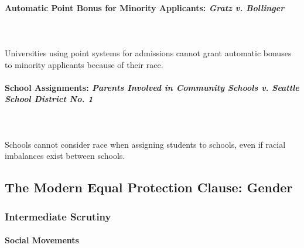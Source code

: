\paragraph{Automatic Point Bonus for Minority Applicants: \emph{Gratz v. 
Bollinger}}
~\\\\
Universities using point systems for admissions cannot grant automatic bonuses 
to minority applicants because of their race.

% 
 
\paragraph{School Assignments: \emph{Parents Involved in Community Schools v. 
Seattle School District No. 1}}
~\\\\
Schools cannot consider race when assigning students to schools, even if 
racial imbalances exist between schools.

% 
% 
 
\subsection{The Modern Equal Protection Clause: Gender}

\subsubsection{Intermediate Scrutiny}

\paragraph{Social Movements}

